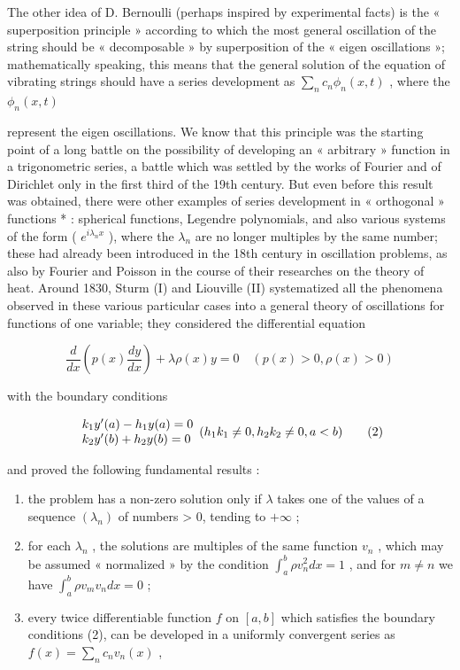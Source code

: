 The other idea of D. Bernoulli (perhaps inspired by experimental facts) is the « superposition principle » according to which the most general oscillation of the string should be « decomposable » by superposition of the « eigen oscillations »; mathematically speaking, this means that the general solution of the equation of vibrating strings should have a series development as \(\sum_{n} c_{n} \phi_{n}(x, t)\) , where the \(\phi_{n}(x, t)\)

represent the eigen oscillations. We know that this principle was the starting point of a long battle on the possibility of developing an « arbitrary » function in a trigonometric series, a battle which was settled by the works of Fourier and of Dirichlet only in the first third of the 19th century. But even before this result was obtained, there were other examples of series development in « orthogonal » functions * : spherical functions, Legendre polynomials, and also various systems of the form ( \(e^{i\lambda_n x}\) ), where the \(\lambda_n\) are no longer multiples by the same number; these had already been introduced in the 18th century in oscillation problems, as also by Fourier and Poisson in the course of their researches on the theory of heat. Around 1830, Sturm (I) and Liouville (II) systematized all the phenomena observed in these various particular cases into a general theory of oscillations for functions of one variable; they considered the differential equation

\[
\frac {d}{d x} \left(p (x) \frac {d y}{d x}\right) + \lambda \rho (x) y = 0 \quad (p (x) > 0, \rho (x) > 0)\tag{1}
\]

with the boundary conditions

\[
\begin{array}{l l} k _ {1} y ^ {\prime} (a) - h _ {1} y (a) = 0 \\ k _ {2} y ^ {\prime} (b) + h _ {2} y (b) = 0 \end{array} (h _ {1} k _ {1} \neq 0, h _ {2} k _ {2} \neq 0, a <   b)\tag{2}
\]

and proved the following fundamental results :

\begin{enumerate}
\def\labelenumi{\arabic{enumi})}
\item
  the problem has a non-zero solution only if \(\lambda\) takes one of the values of a sequence \((\lambda_{n})\) of numbers > 0, tending to \(+\infty\) ;
\item
  for each \(\lambda_{n}\) , the solutions are multiples of the same function \(v_{n}\) , which may be assumed « normalized » by the condition \(\int_{a}^{b} \rho v_{n}^{2} dx = 1\) , and for \(m \neq n\) we have \(\int_{a}^{b} \rho v_{m} v_{n} dx = 0\) ;
\item
  every twice differentiable function \(f\) on \([a, b]\) which satisfies the boundary conditions (2), can be developed in a uniformly convergent series as \(f(x) = \sum_{n} c_{n} v_{n}(x)\) ,
\end{enumerate}

